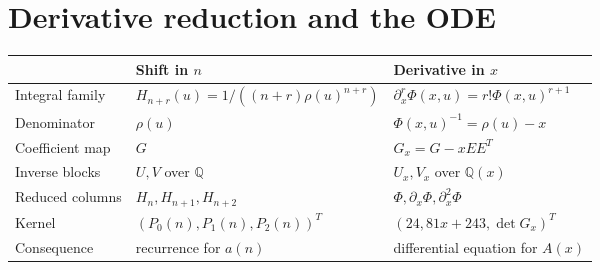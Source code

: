 \documentclass[11pt,fleqn]{article}
\theoremstyle{plain}
\begin{document}
	\clearpage
	\section{Derivative reduction and the ODE}
	
	\begin{center}
		\renewcommand{\arraystretch}{1.22}
		\begin{tabularx}{\textwidth}{>{\raggedright\arraybackslash}p{}
				>{\raggedright\arraybackslash}X
				>{\raggedright\arraybackslash}X}
			\toprule
			& \textbf{Shift in $n$} & \textbf{Derivative in $x$}\\
			\midrule
			Integral family
			& $H_{n+r}(u)=1/((n+r)\rho(u)^{n+r})$
			& $\partial_x^r\Phi(x,u)=r!\Phi(x,u)^{r+1}$\\
			Denominator
			& $\rho(u)$
			& $\Phi(x,u)^{-1}=\rho(u)-x$\\
			Coefficient map
			& $G$
			& $G_x=G-xEE^T$\\
			Inverse blocks
			& $U,V$ over $\mathbb Q$
			& $U_x,V_x$ over $\mathbb Q(x)$\\
			Reduced columns
			& $H_n,H_{n+1},H_{n+2}$
			& $\Phi,\partial_x \Phi,\partial_x^2 \Phi$\\
			Kernel
			& $(P_0(n),P_1(n),P_2(n))^T$
			& $(24,81x+243,\det G_x)^T$\\
			Consequence
			& recurrence for $a(n)$
			& differential equation for $A(x)$\\
			\bottomrule
		\end{tabularx}
	\end{center}
	
\end{document}
